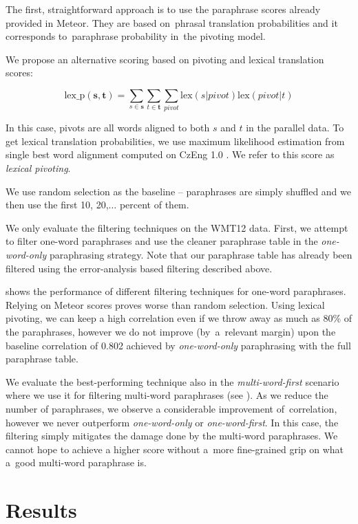 The first, straightforward approach is to use the paraphrase scores already
provided in Meteor. They are based on~phrasal translation probabilities
and it corresponds to~paraphrase probability in~the pivoting model.

We propose an alternative scoring based on pivoting and lexical translation
scores:

$$\text{lex\_p}(\mathbf{s},\mathbf{t}) = \sum_{s \in \mathbf{s}}\sum_{t \in
\mathbf{t}}\sum_{pivot}\text{lex}(s|pivot)\text{lex}(pivot|t)$$

In this case, pivots are all words aligned to both $s$ and $t$ in the parallel
data. To get lexical translation probabilities, we use maximum likelihood
estimation from single best word alignment computed on CzEng 1.0
\citep{czeng10:lrec2012}. We refer to this score as \emph{lexical
pivoting}.

We use random selection as the baseline -- paraphrases are simply shuffled and 
we then use the first 10, 20,$\ldots$ percent of them.

We only evaluate the filtering techniques on the WMT12 data. First, we attempt
to filter one-word paraphrases and use the cleaner paraphrase table in the
\emph{one-word-only} paraphrasing strategy. Note that our paraphrase table has
already been filtered using the error-analysis based filtering described above.

 shows the performance of different filtering
techniques for one-word paraphrases. Relying on Meteor scores proves worse than
random selection. Using lexical pivoting, we can keep a high correlation even 
if we throw away as much as 80\% of the paraphrases, however we do not improve
(by~a~relevant margin) upon the baseline correlation of 0.802 achieved by
\emph{one-word-only} paraphrasing with the full paraphrase table.

We evaluate the best-performing technique also in the \textit{multi-word-first}
scenario where we use it for filtering multi-word paraphrases (see
). As we reduce the number of paraphrases, we observe a
considerable improvement of~correlation, however we never outperform
\textit{one-word-only} or \textit{one-word-first}. In this case, the filtering
simply mitigates the damage done by the multi-word paraphrases. We
cannot hope to achieve a higher score without a~more fine-grained grip on what
a~good multi-word paraphrase is.

\section{Results}
\label{results}

